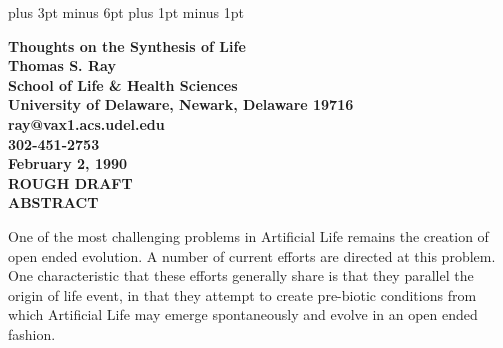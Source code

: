 %
%

\flushbottom
\textheight 9in
\textwidth 6.5in
\textfloatsep 30pt plus 3pt minus 6pt
\parskip 7.5pt plus 1pt minus 1pt
\oddsidemargin 0in
\evensidemargin 0in
\topmargin 0in
\headheight 0in
\headsep 0in

\def\XP{\par\begingroup\parindent 0in\everypar{\hangindent .3in}}
\def\eXP{\par\endgroup}

\def\LP{\par\begingroup\parindent 0in\everypar{\hangindent 0in}}
\def\eLP{\par\endgroup}


\thispagestyle{empty}

\begin{center}
\large \bf Thoughts on the Synthesis of Life\rm \normalsize\\
Thomas S. Ray\\
School of Life \& Health Sciences\\
University of Delaware, Newark, Delaware  19716\\
ray@vax1.acs.udel.edu\\
302-451-2753\\
February 2, 1990\\
\vspace{20pt}
\Huge \bf ROUGH DRAFT\rm \normalsize\\
\vspace{20pt}
\bf ABSTRACT\rm
\end{center}

One of the most challenging problems in Artificial Life remains the creation
of open ended evolution.  A number of current efforts are directed at this
problem.  One characteristic that these efforts generally share is that they
parallel the origin of life event, in that they attempt to create pre-biotic
conditions from which Artificial Life may emerge spontaneously and evolve in
an open ended fashion.

